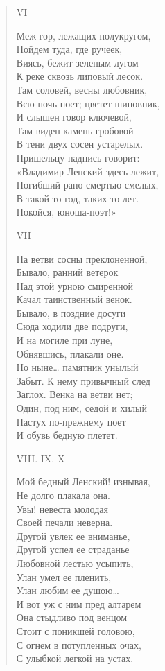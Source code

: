 \begin{verse}
VI

Меж гор, лежащих полукругом,\\
Пойдем туда, где ручеек,\\
Виясь, бежит зеленым лугом\\
К реке сквозь липовый лесок.\\
Там соловей, весны любовник,\\
Всю ночь поет; цветет шиповник,\\
И слышен говор ключевой,\\
Там виден камень гробовой\\
В тени двух сосен устарелых.\\
Пришельцу надпись говорит:\\
«Владимир Ленский здесь лежит,\\
Погибший рано смертью смелых,\\
В такой-то год, таких-то лет.\\
Покойся, юноша-поэт!»

VII

На ветви сосны преклоненной,\\
Бывало, ранний ветерок\\
Над этой урною смиренной\\
Качал таинственный венок.\\
Бывало, в поздние досуги\\
Сюда ходили две подруги,\\
И на могиле при луне,\\
Обнявшись, плакали оне.\\
Но ныне… памятник унылый\\
Забыт. К нему привычный след\\
Заглох. Венка на ветви нет;\\
Один, под ним, седой и хилый\\
Пастух по-прежнему поет\\
И обувь бедную плетет.

VIII. IX. X

Мой бедный Ленский! изнывая,\\
Не долго плакала она.\\
Увы! невеста молодая\\
Своей печали неверна.\\
Другой увлек ее вниманье,\\
Другой успел ее страданье\\
Любовной лестью усыпить,\\
Улан умел ее пленить,\\
Улан любим ее душою…\\
И вот уж с ним пред алтарем\\
Она стыдливо под венцом\\
Стоит с поникшей головою,\\
С огнем в потупленных очах,\\
С улыбкой легкой на устах.


\end{verse}
